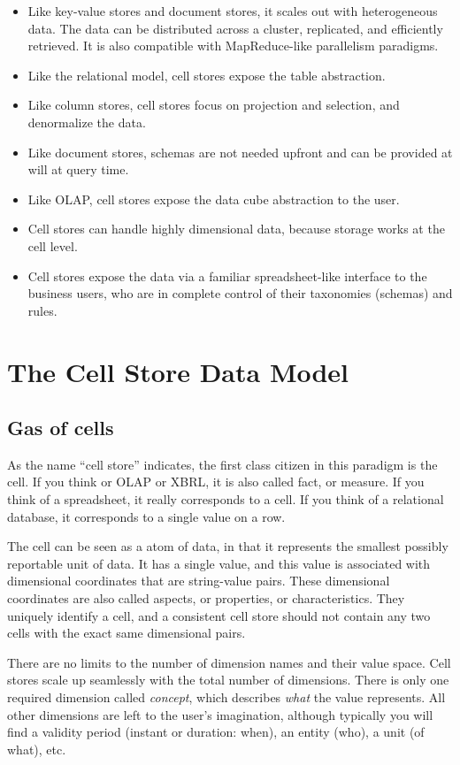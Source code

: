 \documentclass{vldb}
\begin{document}
\begin{itemize}
\item Like key-value stores and document stores, it scales out with heterogeneous data. The data can be distributed across a cluster, replicated, and efficiently retrieved. It is also compatible with MapReduce-like parallelism paradigms.
\item Like the relational model, cell stores expose the table abstraction.
\item Like column stores, cell stores focus on projection and selection, and denormalize the data. 
\item Like document stores, schemas are not needed upfront and can be provided at will at query time.
\item Like OLAP, cell stores expose the data cube abstraction to the user.
\item Cell stores can handle highly dimensional data, because storage works at the cell level.
\item Cell stores expose the data via a familiar spreadsheet-like interface to the business users, who are in complete control of their taxonomies (schemas) and rules.
\end{itemize}

\section{The Cell Store Data Model}

\subsection{Gas of cells}

As the name ``cell store'' indicates, the first class citizen in this paradigm is the cell. If you think or OLAP or XBRL, it is also called fact, or measure. If you think of a spreadsheet, it really corresponds to a cell. If you think of a relational database, it corresponds to a single value on a row.

The cell can be seen as a atom of data, in that it represents the smallest possibly reportable unit of data. It has a single value, and this value is associated with dimensional coordinates that are string-value pairs. These dimensional coordinates are also called aspects, or properties, or characteristics. They uniquely identify a cell, and a consistent cell store should not contain any two cells with the exact same dimensional pairs.

There are no limits to the number of dimension names and their value space. Cell stores scale up seamlessly with the total number of dimensions. There is only one required dimension called \emph{concept}, which describes \emph{what} the value represents. All other dimensions are left to the user's imagination, although typically you will find a validity period (instant or duration: when), an entity (who), a unit (of what), etc.
\end{document}
